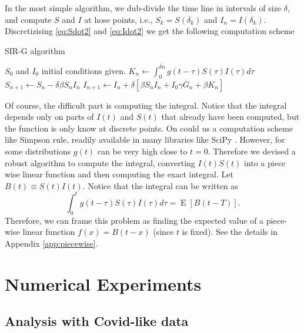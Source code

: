 \documentclass[twoside,USenglish,10pt]{article}
\newcommand{\Gb}{\overline{G}\xspace}
\DeclareMathOperator{\Exp}{E}       %
\newcommand{\E}[1]{\Exp\left[{#1}\right]}       %
\begin{document}
In the most simple algorithm, we dub-divide the time line in intervals of size $\delta$, and compute $S$ and $I$ at hose points, i.e., $S_k=S(\delta_k)$ and $I_n=I(\delta_k)$. Discretizising \eqref{eq:Sdot2} and \eqref{eq:Idot2} we get the following computation scheme

\begin{algorithm}
    \caption{SIR-G algorithm}
    \label{al:simple}
    \begin{algorithmic}[1] %
		\State	$S_0$ and $I_0$  initial conditions given.
			\State $K_n \gets \int_0^{\delta n} g(t-\tau) S(\tau)I(\tau)d\tau$  
			\State $S_{n+1} \gets  S_n - \delta\beta S_n I_n$
			\State $I_{n+1} \gets  I_n + \delta\left[\beta S_n I_n + I_0\gamma\Gb_n + \beta K_n\right]$
		\EndFor	
    \end{algorithmic}
\end{algorithm}


Of course, the difficult part is computing the integral. Notice that the integral depends only on parts of $I(t)$ and $S(t)$ that already have been computed, but the function is only know at discrete points.
On could us a computation scheme like Simpson rule, readily available in many libraries like SciPy \cite{jon.ea.01}. However, for some distributions $g(t)$ can be very high close to $t=0$. Therefore we devised a robust algorithm to compute the integral, converting $I(t)S(t)$ into a piece wise linear function and then computing the exact integral. Let $B(t)\equiv S(t)I(t)$. Notice that the integral can be written as
\[ \int_0^{t} g(t-\tau) S(\tau)I(\tau)d\tau = \E{B(t-T)}.  \]
Therefore, we can frame this problem as finding the expected value of a piece-wise linear function $f(x)=B(t-x)$ (since $t$ is fixed). See the details in Appendix \ref{app:piecewise}.

\section{Numerical Experiments}\label{sc:numerical}

\subsection{Analysis with Covid-like data}
\end{document}
